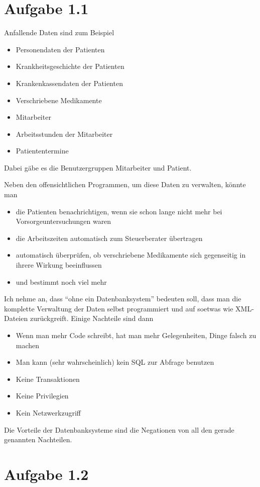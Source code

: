 \documentclass[10pt,a4paper]{article}
\begin{document}
\section{Aufgabe 1.1}

Anfallende Daten sind zum Beispiel
\begin{itemize}
\item Personendaten der Patienten
\item Krankheitsgeschichte der Patienten
\item Krankenkassendaten der Patienten
\item Verschriebene Medikamente
\item Mitarbeiter
\item Arbeitsstunden der Mitarbeiter
\item Patiententermine
\end{itemize}

Dabei gäbe es die Benutzergruppen Mitarbeiter und Patient.

Neben den offensichtlichen Programmen, um diese Daten zu verwalten, könnte man
\begin{itemize}
\item die Patienten benachrichtigen, wenn sie schon lange nicht mehr bei
  Vorsorgeuntersuchungen waren
\item die Arbeitszeiten automatisch zum Steuerberater übertragen
\item automatisch überprüfen, ob verschriebene Medikamente sich gegenseitig in
  ihrere Wirkung beeinflussen
\item und bestimmt noch viel mehr
\end{itemize}

Ich nehme an, dass ``ohne ein Datenbanksystem'' bedeuten soll, dass man die
komplette Verwaltung der Daten selbst programmiert und auf soetwas wie
XML-Dateien zurückgreift. Einige Nachteile sind dann
\begin{itemize}
\item Wenn man mehr Code schreibt, hat man mehr Gelegenheiten, Dinge falsch zu
  machen
\item Man kann (sehr wahrscheinlich) kein SQL zur Abfrage benutzen
\item Keine Transaktionen
\item Keine Privilegien
\item Kein Netzwerkzugriff
\end{itemize}
Die Vorteile der Datenbanksysteme sind die Negationen von all den gerade
genannten Nachteilen.

\section{Aufgabe 1.2}
\end{document}
